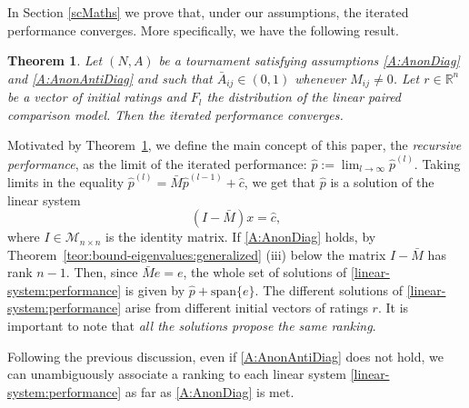 \documentclass[a4paper,10pt]{article}
\newtheorem{theorem}{Theorem}
\theoremstyle{remark}
\newcommand{\TM}{A} %
\newcommand{\MM}{M} %
\newcommand{\MS}{\mathcal M} %
\newcommand{\rv}{r} %
\newcommand{\pv}{p} %
\begin{document}
In Section \ref{scMaths} we prove that, under our assumptions, the
iterated performance converges. More specifically, we have the
following result.

\begin{theorem}\label{thConvergence}
Let $(N,\TM)$ be a tournament satisfying assumptions
\ref{A:AnonDiag} and \ref{A:AnonAntiDiag} and such that
$\bar\TM_{ij}\in (0,1)$ whenever $\MM_{ij}\neq 0$. Let
$\rv\in\mathbb{R}^n$ be a vector of initial ratings and $F_l$ the
distribution of the linear paired comparison model. Then the
iterated performance converges.
\end{theorem}

Motivated by Theorem~\ref{thConvergence}, we define the main concept of this paper, the \emph{recursive performance}, as the limit of the iterated performance:
$\hat{\pv}:=\lim_{l\to\infty}\hat{\pv}^{(l)}$. Taking limits in the equality
$\hat{\pv}^{(l)}=\bar \MM \hat \pv^{(l-1)}+\hat{c}$, we get that
$\hat{\pv}$ is a solution of the linear system
\begin{equation}\label{linear-system:performance}
(I-\bar{\MM})x=\hat c,
\end{equation}
where $I\in \MS_{n\times n}$ is the identity matrix. If
\ref{A:AnonDiag} holds, by
Theorem~\ref{teor:bound-eigenvalues:generalized} (iii) below the
matrix $I-\bar{\MM}$ has rank $n-1$. Then, since $\bar{\MM}e=e$, the
whole set of solutions of \eqref{linear-system:performance} is
given by $\hat{\pv}+\text{span}\{e\}$. The different solutions of
\eqref{linear-system:performance} arise from different initial
vectors of ratings $\rv$. It is important to note that \emph{all the
solutions propose the same ranking}.

Following the previous discussion, even if \ref{A:AnonAntiDiag}
does not hold, we can unambiguously associate a ranking to each
linear system \eqref{linear-system:performance} as far as
\ref{A:AnonDiag} is met.
\end{document}
